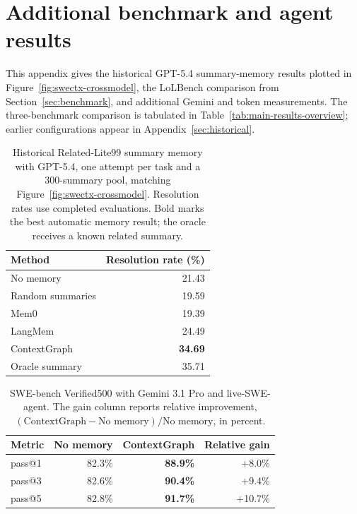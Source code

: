 \section{Additional benchmark and agent results}
\label{sec:new-results}
This appendix gives the historical GPT-5.4 summary-memory results plotted in
Figure~\ref{fig:swectx-crossmodel}, the LoLBench comparison from
Section~\ref{sec:benchmark}, and additional Gemini and token measurements.
The three-benchmark comparison is tabulated in
Table~\ref{tab:main-results-overview}; earlier configurations appear in
Appendix~\ref{sec:historical}.

\begin{table}[htbp]
\centering
\caption{Historical Related-Lite99 summary memory with GPT-5.4, one attempt
per task and a 300-summary pool, matching Figure~\ref{fig:swectx-crossmodel}.
Resolution rates use completed evaluations. Bold marks the best automatic
memory result; the oracle receives a known related summary.}
\label{tab:new-swectx}
\begin{tabular}{lr}
\toprule
Method & Resolution rate (\%) \\
\midrule
No memory & 21.43 \\
Random summaries & 19.59 \\
Mem0 & 19.39 \\
LangMem & 24.49 \\
ContextGraph & \textbf{34.69} \\
\midrule
Oracle summary & 35.71 \\
\bottomrule
\end{tabular}
\end{table}

\begin{table}[htbp]
\centering
\caption{SWE-bench Verified500 with Gemini 3.1 Pro and live-SWE-agent.
The gain column reports relative improvement,
$(\text{ContextGraph}-\text{No memory})/\text{No memory}$, in percent.}
\label{tab:new-gemini}
\begin{tabular}{lrrr}
\toprule
Metric & No memory & ContextGraph & Relative gain \\
\midrule
pass@1 & 82.3\% & \textbf{88.9\%} & +8.0\% \\
pass@3 & 82.6\% & \textbf{90.4\%} & +9.4\% \\
pass@5 & 82.8\% & \textbf{91.7\%} & +10.7\% \\
\bottomrule
\end{tabular}
\end{table}

